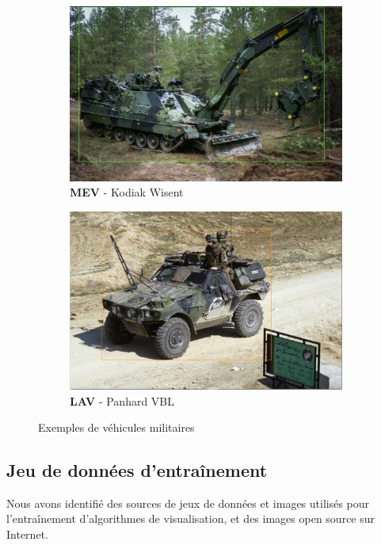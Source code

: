 \begin{figure}[H]
\begin{subfigure}[b]{0.45\textwidth}
        \includegraphics[width=\textwidth]{./images/mev.png}
        \caption{\textbf{MEV} - Kodiak Wisent}
        \label{fig:mev}
    \end{subfigure}
    \hfill
    \begin{subfigure}[b]{0.45\textwidth}
        \centering
        \includegraphics[width=\textwidth]{./images/lav.png}
        \caption{\textbf{LAV} - Panhard VBL}
        \label{fig:lav}
    \end{subfigure}
    \caption{Exemples de véhicules militaires}
    \label{fig:military-vehicles}
\end{figure}


\subsection{Jeu de données d’entraînement}

Nous avons identifié des sources de jeux de données et images  utilisés pour l’entraînement d’algorithmes de visualisation, et des images open source sur Internet.

